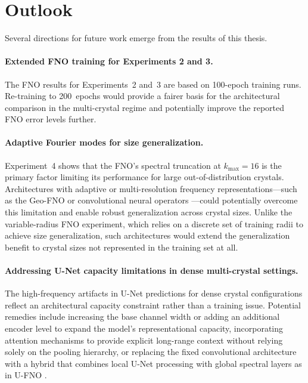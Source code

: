 \section{Outlook}

Several directions for future work emerge from the results of this thesis.

\paragraph{Extended FNO training for Experiments 2 and 3.}
The FNO results for Experiments~2 and~3 are based on 100-epoch training runs. Re-training to 200~epochs would provide a fairer basis for the architectural comparison in the multi-crystal regime and potentially improve the reported FNO error levels further.

\paragraph{Adaptive Fourier modes for size generalization.}
Experiment~4 shows that the FNO's spectral truncation at $k_{\max} = 16$ is the primary factor limiting its performance for large out-of-distribution crystals. Architectures with adaptive or multi-resolution frequency representations—such as the Geo-FNO \parencite{li_fourier_nodate} or convolutional neural operators \parencite{raonic_convolutional_2023}—could potentially overcome this limitation and enable robust generalization across crystal sizes. Unlike the variable-radius FNO experiment, which relies on a discrete set of training radii to achieve size generalization, such architectures would extend the generalization benefit to crystal sizes not represented in the training set at all.

\paragraph{Addressing U-Net capacity limitations in dense multi-crystal settings.}
The high-frequency artifacts in U-Net predictions for dense crystal configurations reflect an architectural capacity constraint rather than a training issue. Potential remedies include increasing the base channel width or adding an additional encoder level to expand the model's representational capacity, incorporating attention mechanisms to provide explicit long-range context without relying solely on the pooling hierarchy, or replacing the fixed convolutional architecture with a hybrid that combines local U-Net processing with global spectral layers as in U-FNO \parencite{wen_u-fnoenhanced_2022}.

